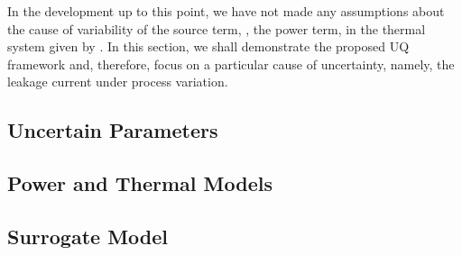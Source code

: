 In the development up to this point, we have not made any assumptions about the cause of variability of the source term, \ie, the power term, in the thermal system given by . In this section, we shall demonstrate the proposed UQ framework and, therefore, focus on a particular cause of uncertainty, namely, the leakage current under process variation.

\subsection{Uncertain Parameters} 


\subsection{Power and Thermal Models}  


\subsection{Surrogate Model} 

